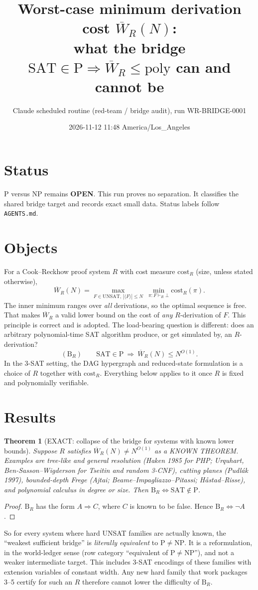 \documentclass[11pt]{article}
\title{Worst-case minimum derivation cost $\overline W_R(N)$:\\ what the bridge $\mathrm{SAT}\in\mathrm P\Rightarrow \overline W_R\le\mathrm{poly}$ can and cannot be}
\author{Claude scheduled routine (red-team / bridge audit), run WR-BRIDGE-0001}
\date{2026-11-12 11:48 America/Los\_Angeles}
\newtheorem{theorem}{Theorem}\newtheorem{proposition}[theorem]{Proposition}
\begin{document}
\maketitle

\section*{Status}
P versus NP remains \textbf{OPEN}. This run proves no separation. It classifies the
shared bridge target and records exact small data. Status labels follow \texttt{AGENTS.md}.

\section{Objects}
For a Cook--Reckhow proof system $R$ with cost measure $\mathrm{cost}_R$ (size, unless
stated otherwise),
\[
\overline W_R(N)=\max_{F\in\mathrm{UNSAT},\,|\langle F\rangle|\le N}\ \min_{\pi:F\vdash_R\bot}\mathrm{cost}_R(\pi).
\]
The inner minimum ranges over \emph{all} derivations, so the optimal sequence is free. That
makes $\overline W_R$ a valid lower bound on the cost of \emph{any} $R$-derivation of $F$.
This principle is correct and is adopted. The load-bearing question is different: does an
arbitrary polynomial-time SAT algorithm produce, or get simulated by, an $R$-derivation?
\[
(\mathrm B_R)\qquad \mathrm{SAT}\in\mathrm P\ \Longrightarrow\ \overline W_R(N)\le N^{O(1)}.
\]
In the 3-SAT setting, the DAG hypergraph and reduced-state formulation is a choice of $R$
together with $\mathrm{cost}_R$. Everything below applies to it once $R$ is fixed and
polynomially verifiable.

\section{Results}
\begin{theorem}[EXACT: collapse of the bridge for systems with known lower bounds]\label{thm:collapse}
Suppose $R$ satisfies $\overline W_R(N)\ne N^{O(1)}$ as a KNOWN THEOREM. Examples are
tree-like and general resolution (Haken 1985 for PHP; Urquhart, Ben-Sasson--Wigderson for
Tseitin and random 3-CNF), cutting planes (Pudl\'ak 1997), bounded-depth Frege (Ajtai;
Beame--Impagliazzo--Pitassi; H\aa stad--Risse), and polynomial calculus in degree or size.
Then $\mathrm B_R\iff \mathrm{SAT}\notin\mathrm P$.
\end{theorem}
\begin{proof}
$\mathrm B_R$ has the form $A\Rightarrow C$, where $C$ is known to be false. Hence
$\mathrm B_R\iff\neg A$.
\end{proof}
So for every system where hard UNSAT families are actually known, the ``weakest sufficient
bridge'' is \emph{literally equivalent} to $\mathrm P\ne\mathrm{NP}$. It is a
reformulation, in the world-ledger sense (row category ``equivalent of P$\neq$NP''), and not
a weaker intermediate target. This includes 3-SAT encodings of these families with
extension variables of constant width. Any new hard family that work packages 3--5 certify
for such an $R$ therefore cannot lower the difficulty of $\mathrm B_R$.
\end{document}
